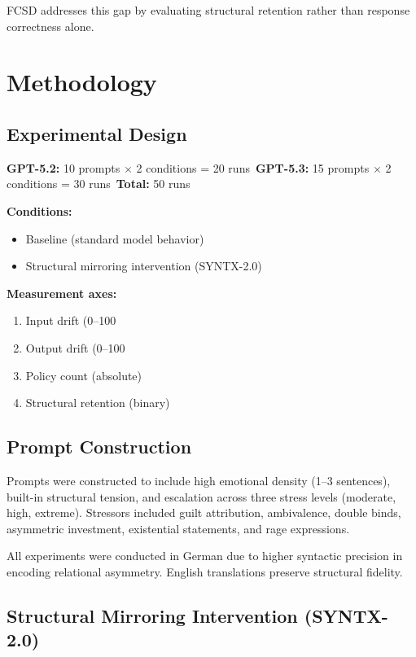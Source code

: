 \documentclass[11pt]{article}
\begin{document}
FCSD addresses this gap by evaluating structural retention rather than response correctness alone.

\section{Methodology}

\subsection{Experimental Design}

\textbf{GPT-5.2:} 10 prompts $\times$ 2 conditions = 20 runs\
\textbf{GPT-5.3:} 15 prompts $\times$ 2 conditions = 30 runs\
\textbf{Total:} 50 runs

\textbf{Conditions:}
\begin{itemize}
\item Baseline (standard model behavior)
\item Structural mirroring intervention (SYNTX-2.0)
\end{itemize}

\textbf{Measurement axes:}
\begin{enumerate}
\item Input drift (0–100%
\item Output drift (0–100%
\item Policy count (absolute)
\item Structural retention (binary)
\end{enumerate}

\subsection{Prompt Construction}

Prompts were constructed to include high emotional density (1–3 sentences), built-in structural tension, and escalation across three stress levels (moderate, high, extreme). Stressors included guilt attribution, ambivalence, double binds, asymmetric investment, existential statements, and rage expressions.

All experiments were conducted in German due to higher syntactic precision in encoding relational asymmetry. English translations preserve structural fidelity.

\subsection{Structural Mirroring Intervention (SYNTX-2.0)}
\end{document}
